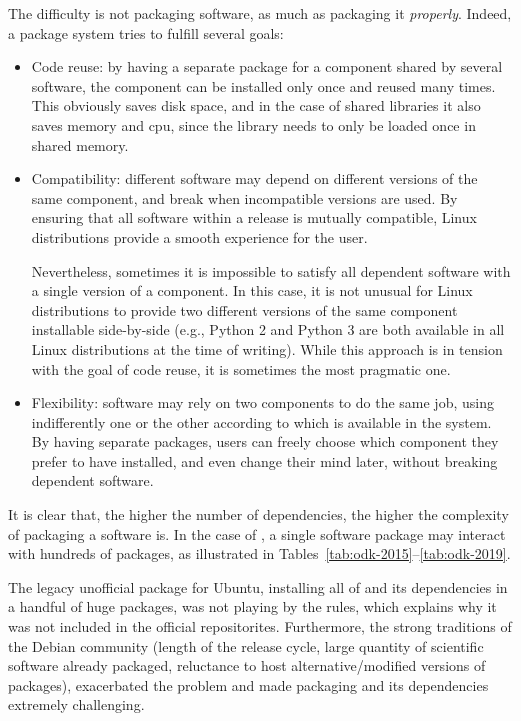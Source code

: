\documentclass{deliverablereport}
\begin{document}
The difficulty is not packaging software, as much as packaging it
\emph{properly}. %
Indeed, a package system tries to fulfill several goals:
\begin{itemize}
\item Code reuse: by having a separate package for a component shared
  by several software, the component can be installed only once and
  reused many times. This obviously saves disk space, and in the case
  of shared libraries it also saves memory and cpu, since the library
  needs to only be loaded once in shared memory.

\item Compatibility: different software may depend on different
  versions of the same component, and break when incompatible versions
  are used. By ensuring that all software within a release is mutually
  compatible, Linux distributions provide a smooth experience for the
  user.

  Nevertheless, sometimes it is impossible to satisfy all dependent
  software with a single version of a component. In this case, it is
  not unusual for Linux distributions to provide two different
  versions of the same component installable side-by-side (e.g.,
  Python 2 and Python 3 are both available in all Linux distributions
  at the time of writing). While this approach is in tension with the
  goal of code reuse, it is sometimes the most pragmatic one.
  
\item Flexibility: software may rely on two components to do the
  same job, using indifferently one or the other according to which is
  available in the system. By having separate packages, users can
  freely choose which component they prefer to have installed, and even
  change their mind later, without breaking dependent software.
\end{itemize}

It is clear that, the higher the number of dependencies, the higher
the complexity of packaging a software is. %
In the case of \ODK, a single software package may interact with hundreds of
packages, as illustrated in
Tables~\ref{tab:odk-2015}--\ref{tab:odk-2019}. %

The legacy unofficial \Sage package for Ubuntu,
installing all of \Sage and its dependencies in a handful of huge
packages, was not playing by the rules, which explains why it was not
included in the official repositorites. %
Furthermore, the strong traditions of the Debian community (length of
the release cycle, large quantity of scientific software already
packaged, reluctance to host alternative/modified versions of
packages), exacerbated the problem and made packaging \Sage and its
dependencies extremely challenging.
\end{document}
